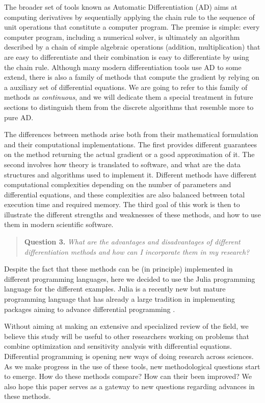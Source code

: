 The broader set of tools known as Automatic Differentiation (AD) aims at computing derivatives by sequentially applying the chain rule to the sequence of unit operations that constitute a computer program. 
The premise is simple: every computer program, including a numerical solver, is ultimately an algorithm described by a chain of simple algebraic operations (addition, multiplication) that are easy to differentiate and their combination is easy to differentiate by using the chain rule. 
Although many modern differentiation tools use AD to some extend, there is also a family of methods that compute the gradient by relying on a auxiliary set of differential equations. 
We are going to refer to this family of methods as \textit{continuous}, and we will dedicate them a special treatment in future sections to distinguish them from the discrete algorithms that resemble more to pure AD. 

The differences between methods arise both from their mathematical formulation and their computational implementations. 
The first provides different guarantees on the method returning the actual gradient or a good approximation of it. 
The second involves how theory is translated to software, and what are the data structures and algorithms used to implement it. 
Different methods have different computational complexities depending on the number of parameters and differential equations, and these complexities are also balanced between total execution time and required memory. 
The third goal of this work is then to illustrate the different strengths and weaknesses of these methods, and how to use them in modern scientific software. 
\begin{quote}
    \textbf{Question 3. }
    \textit{What are the advantages and disadvantages of different differentiation methods and how can I incorporate them in my research?}
\end{quote}
Despite the fact that these methods can be (in principle) implemented in different programming languages, here we decided to use the Julia programming language for the different examples. 
Julia is a recently new but mature programming language that has already a large tradition in implementing packages aiming to advance differential programming \cite{Julialang_2017}. 

Without aiming at making an extensive and specialized review of the field, we believe this study will be useful to other researchers working on problems that combine optimization and sensitivity analysis with differential equations.
Differential programming is opening new ways of doing research across sciences. 
As we make progress in the use of these tools, new methodological questions start to emerge. 
How do these methods compare? How can their been improved? 
We also hope this paper serves as a gateway to new questions regarding advances in these methods. 

